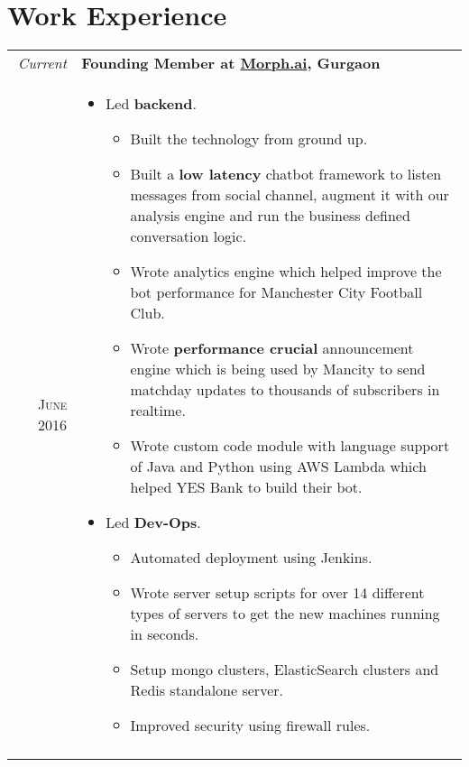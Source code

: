 \documentclass[a4paper,10pt]{article}
\begin{document}
\section{Work Experience}
\begin{tabular}{r|p{16cm}}
 \emph{Current} & \textbf{Founding Member at \href{http://www.morph.ai}{Morph.ai}, Gurgaon} \\\textsc{June 2016}&
 \begin{itemize}[noitemsep]
 \item Led \textbf{backend}.
 \begin{itemize}[noitemsep]
 \item Built the technology from ground up.
 \item Built a \textbf{low latency} chatbot framework to listen messages from social channel, augment it with our analysis engine and run the business defined conversation logic.
 \item Wrote analytics engine which helped improve the bot performance for Manchester City Football Club.
 \item Wrote \textbf{performance crucial} announcement engine which is being used by Mancity to send matchday updates to thousands of subscribers in realtime.
 \item Wrote custom code module with language support of Java and Python using AWS Lambda which helped YES Bank to build their bot.
 \end{itemize}

 \item Led \textbf{Dev-Ops}.
 \begin{itemize}[noitemsep]
 \item Automated deployment using Jenkins.
 \item Wrote server setup scripts for over 14 different types of servers to get the new machines running in seconds.
 \item Setup mongo clusters, ElasticSearch clusters and Redis standalone server.
 \item Improved security using firewall rules.
 \end{itemize}
 \end{itemize}\\\multicolumn{2}{c}{} \\


\end{tabular}
\end{document}
